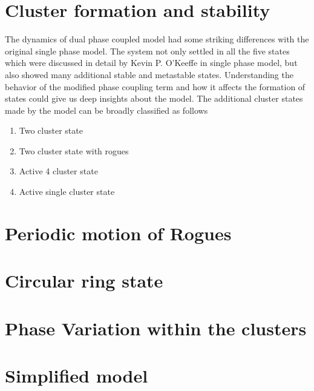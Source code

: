 \documentclass[twocolumn,10pt]{asme2ej}
\begin{document}



\section{Cluster formation and stability}
{
    The dynamics of dual phase coupled model had some striking differences with the original single phase model. The system not only settled in all the five states which were discussed in detail by Kevin P. O'Keeffe in single phase model, but also showed many additional stable and metastable states. Understanding the behavior of the modified phase coupling term and how it affects the formation of states could give us deep insights about the model.
    The additional cluster states made by the model can be broadly classified as follows 
    \begin{enumerate}[label = (\alph*)]
        \item Two cluster state
        \item Two cluster state with rogues 
        \item Active 4 cluster state
        \item Active single cluster state
    \end{enumerate}
    
}
\section{Periodic motion of Rogues}

\section{Circular ring state}

\section{Phase Variation within the clusters}

\noindent

\section{Simplified model}
\end{document}
